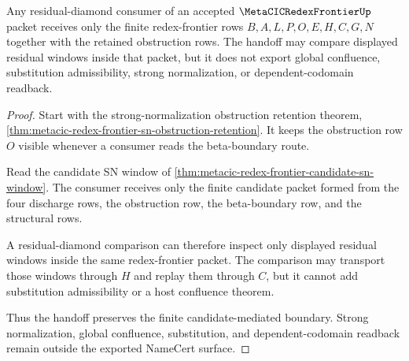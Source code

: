\begin{theorem}
\label{thm:metacic-redex-frontier-residual-diamond-handoff}
Any residual-diamond consumer of an accepted $\MetaCICRedexFrontierUp$ packet receives only the finite redex-frontier rows $B,A,L,P,O,E,H,C,G,N$ together with the retained obstruction rows. The handoff may compare displayed residual windows inside that packet, but it does not export global confluence, substitution admissibility, strong normalization, or dependent-codomain readback.
\end{theorem}
\begin{proof}
Start with the strong-normalization obstruction retention theorem, \autoref{thm:metacic-redex-frontier-sn-obstruction-retention}. It keeps the obstruction row $O$ visible whenever a consumer reads the beta-boundary route.

Read the candidate SN window of \autoref{thm:metacic-redex-frontier-candidate-sn-window}. The consumer receives only the finite candidate packet formed from the four discharge rows, the obstruction row, the beta-boundary row, and the structural rows.

A residual-diamond comparison can therefore inspect only displayed residual windows inside the same redex-frontier packet. The comparison may transport those windows through $H$ and replay them through $C$, but it cannot add substitution admissibility or a host confluence theorem.

Thus the handoff preserves the finite candidate-mediated boundary. Strong normalization, global confluence, substitution, and dependent-codomain readback remain outside the exported NameCert surface.
\end{proof}

